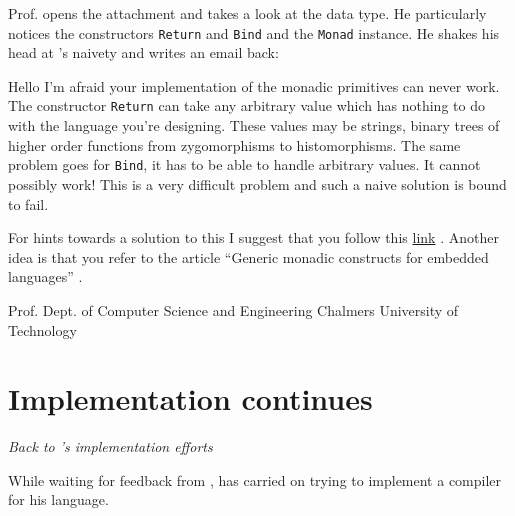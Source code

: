 \vspace{5mm}

Prof. \docname{} opens the attachment and takes a look at the data type. He 
particularly notices the constructors {\tt Return} and {\tt Bind} and the 
{\tt Monad} instance. He shakes his head at \studname{}'s naivety and writes an 
email back:

\vspace{5mm}

\noindent\colorbox{light-gray}{
\begin{minipage}[]{0.9\linewidth}
\noindent 
Hello \studname{}
\newline \newline
\noindent I'm afraid your implementation of the monadic primitives can never 
work. The constructor {\tt Return} can take any arbitrary value which has 
nothing to do with the language you're designing. These values may be 
strings, binary trees of higher order functions from zygomorphisms to 
histomorphisms. The same problem goes for {\tt Bind}, it has to be able 
to handle arbitrary values. It cannot possibly work! This is a very 
difficult problem and such a naive solution is bound to fail. 

\noindent For hints towards a solution to this I suggest that you follow 
this \underline{link} \cite{GillBlog}. Another idea is that you refer 
to the article ``Generic monadic constructs for embedded languages'' 
\cite{Generic}. \newline \newline 

\noindent Prof. \docname{} \newline
\noindent Dept. of Computer Science and Engineering \newline
\noindent Chalmers University of Technology 
\end{minipage} 
}

\vspace{5mm}


\section{Implementation continues}
\emph{Back to \studname{}'s implementation efforts} \newline \newline

\noindent While waiting for feedback from \docname{}, \studname{} has carried on trying to implement
a compiler for his language. 

